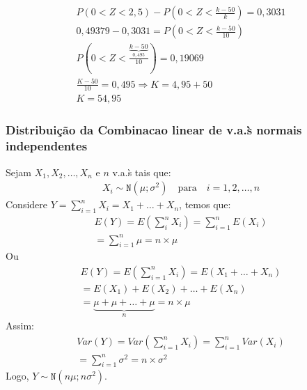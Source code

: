 \begin{description}
\begin{description}
\begin{description}
\begin{enumerate}[label=(\alph*)]
    \begin{align*}
      P(0 < Z < 2,5)  - P(0 < Z  < \frac{k-50}{k})=0,3031 \\
      0,49379 - 0,3031 = P(0 < Z < \frac{k-50}{10}) \\
      P(0<Z < \frac{\underbrace{k-50}_{0,495}}{10})= 0,19069  \\
      \frac{K-50}{10}= 0,495 \Rightarrow  K=4,95 +50 \\
      K=54,95
    \end{align*}
\end{enumerate}

    \end{description}
  \end{description}
  \subsubsection{Distribuição da Combinacao linear de v.a.\`s normais independentes}
  \begin{description}
    \item Sejam $X_1, X_2 , \ldots, X_n $ e  $n$ v.a.\`s tais que:
  \begin{align*}
    X_i \sim \mathtt{N}(\mu ; \sigma^2)  \quad \text{para} \quad i=1,2,\ldots,n
  \end{align*}
  Considere $Y= \sum_{i=1}^{n} X_i = X_1+\ldots+X_n$, temos que:
  \begin{align*}
    E(Y)  = E( \sum_{i}^{n} X_i ) = \sum_{i=1}^{n} E(X_i) \\
    = \sum_{i=1}^{n} \mu = n \times \mu
  \end{align*}
  Ou
  \begin{align*}
    E(Y )  =E( \sum_{i=1}^n X_i )= E(X_1 + \ldots +X_n) \\
    = E(X_1) +E(X_2) + \ldots +E(X_n)\\
    =\underbrace{\mu + \mu + \dots + \mu}_{n} = n \times \mu
  \end{align*}
  Assim:
  \begin{align*}
    Var(Y) = Var(\sum_{i=1}^{n} X_i)= \sum^{n}_{i=1} Var(X_i) \\
    = \sum_{i=1}^{n} \sigma^2 = n  \times \sigma^2
  \end{align*}
  Logo, $Y \sim \mathtt{N}(n\mu ; n \sigma^2)$.


\end{description}
\end{description}
